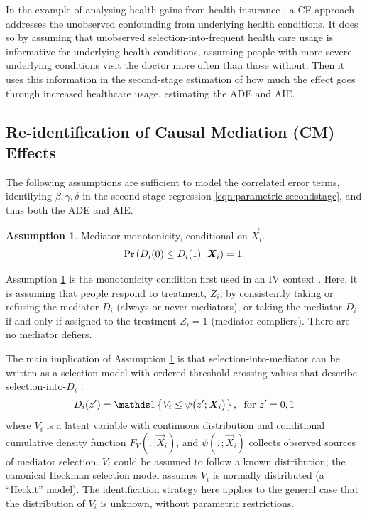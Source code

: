 In the example of analysing health gains from health insurance \citep{finkelstein2008oregon}, a CF approach addresses the unobserved confounding from underlying health conditions.
It does so by assuming that unobserved selection-into-frequent health care usage is informative for underlying health conditions, assuming people with more severe underlying conditions visit the doctor more often than those without.
Then it uses this information in the second-stage estimation of how much the effect goes through increased healthcare usage, estimating the ADE and AIE.

\subsection{Re-identification of Causal Mediation (CM) Effects}
The following assumptions are sufficient to model the correlated error terms, identifying $\beta, \gamma, \delta$ in the second-stage regression \eqref{eqn:parametric-secondstage}, and thus both the ADE and AIE.

\theoremstyle{definition}
\newtheorem{assumptionCF}{Assumption}
\renewcommand\theassumptionCF{CF--\arabic{assumptionCF}}
\begin{assumptionCF}
    \label{cf:monotonicity}
    Mediator monotonicity, conditional on $\vec X_i$.
    \[ \Pr\left(  D_i(0) \leq D_i(1)  \, \middle\vert \, \boldsymbol{\mathit{X}}_i \right) = 1. \]
\end{assumptionCF}
\noindent
Assumption \ref{cf:monotonicity} is the monotonicity condition first used in an IV context \citep{imbens1994identification}.
Here, it is assuming that people respond to treatment, $Z_i$, by consistently taking or refusing the mediator $D_i$ (always or never-mediators), or taking the mediator $D_i$ if and only if assigned to the treatment $Z_i=1$ (mediator compliers).
There are no mediator defiers.

The main implication of Assumption \ref{cf:monotonicity} is that selection-into-mediator can be written as a selection model with ordered threshold crossing values that describe selection-into-$D_i$ \citep{vytlacil2002independence}.
\[ D_i(z') = \indicator{V_i \leq \psi \big( z'; \vec X_i \big)},
    \;\text{ for } z'=0,1 \]
where $V_i$ is a latent variable with continuous distribution and conditional cumulative density function $F_V(. \,|\vec X_i)$, and $\psi(. \,;\vec X_i)$ collects observed sources of mediator selection.
$V_i$ could be assumed to follow a known distribution; the canonical Heckman selection model assumes $V_i$ is normally distributed (a ``Heckit'' model).
The identification strategy here applies to the general case that the distribution of $V_i$ is unknown, without parametric restrictions.

